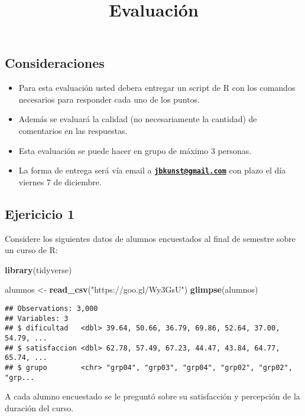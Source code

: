 \documentclass[]{article}
\title{Evaluación}
\author{}
\date{}
\newenvironment{Shaded}{\begin{snugshade}}{\end{snugshade}}
\newcommand{\KeywordTok}[1]{\textcolor[rgb]{0.13,0.29,0.53}{\textbf{#1}}}
\newcommand{\StringTok}[1]{\textcolor[rgb]{0.31,0.60,0.02}{#1}}
\newcommand{\NormalTok}[1]{#1}
\providecommand{\tightlist}{%
  \setlength{\itemsep}{0pt}\setlength{\parskip}{0pt}}
\begin{document}
\maketitle

\subsection{Consideraciones}\label{consideraciones}

\begin{itemize}
\tightlist
\item
  Para esta evaluación usted debera entregar un script de R con los
  comandos necesarios para responder cada uno de los puntos.
\item
  Además se evaluará la calidad (no necesariamente la cantidad) de
  comentarios en las respuestas.
\item
  Esta evaluación se puede hacer en grupo de máximo 3 personas.
\item
  La forma de entrega será vía email a
  \textbf{\href{mailto:jbkunst@gmail.com}{\nolinkurl{jbkunst@gmail.com}}}
  con plazo el día viernes 7 de diciembre.
\end{itemize}

\subsection{Ejericicio 1}\label{ejericicio-1}

Considere los siguientes datos de alumnos encuestados al final de
semestre sobre un curso de R:

\begin{Shaded}
\begin{Highlighting}[]
\KeywordTok{library}\NormalTok{(tidyverse)}

\NormalTok{alumnos <-}\StringTok{ }\KeywordTok{read_csv}\NormalTok{(}\StringTok{"https://goo.gl/Wy3GsU"}\NormalTok{)}
\KeywordTok{glimpse}\NormalTok{(alumnos)}
\end{Highlighting}
\end{Shaded}

\begin{verbatim}
## Observations: 3,000
## Variables: 3
## $ dificultad   <dbl> 39.64, 50.66, 36.79, 69.86, 52.64, 37.00, 54.79, ...
## $ satisfaccion <dbl> 62.78, 57.49, 67.23, 44.47, 43.84, 64.77, 65.74, ...
## $ grupo        <chr> "grp04", "grp03", "grp04", "grp02", "grp02", "grp...
\end{verbatim}

A cada alumno encuestado se le preguntó sobre su satisfacción y
percepción de la duración del curso.
\end{document}
